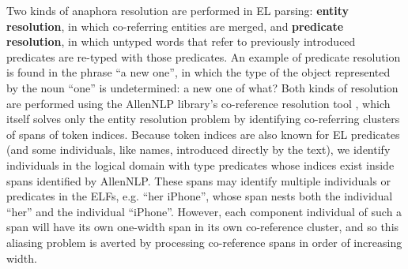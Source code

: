 Two kinds of anaphora resolution are performed in EL parsing: \textbf{entity resolution}, in which co-referring entities are merged, and \textbf{predicate resolution}, in which untyped words that refer to previously introduced predicates are re-typed with those predicates. An example of predicate resolution is found in the phrase ``a new one'', in which the type of the object represented by the noun ``one'' is undetermined: a new one of what? Both kinds of resolution are performed using the AllenNLP library's co-reference resolution tool \citep{Gardner2017AllenNLP}, which itself solves only the entity resolution problem by identifying co-referring clusters of spans of token indices. Because token indices are also known for EL predicates (and some individuals, like names, introduced directly by the text), we identify individuals in the logical domain with type predicates whose indices exist inside spans identified by AllenNLP. These spans may identify multiple individuals or predicates in the ELFs, e.g. ``her iPhone'', whose span nests both the individual ``her'' and the individual ``iPhone''. However, each component individual of such a span will have its own one-width span in its own co-reference cluster, and so this aliasing problem is averted by processing co-reference spans in order of increasing width.

